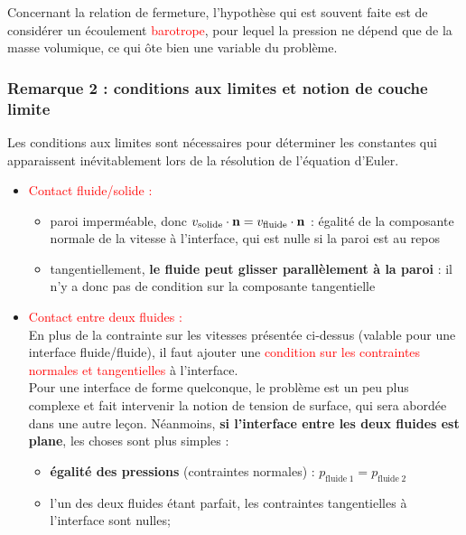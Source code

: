 \documentclass[11pt,a4paper]{report}
\begin{document}
Concernant la relation de fermeture, l'hypothèse qui est souvent faite est de considérer un écoulement \textcolor{red}{barotrope}, pour lequel la pression ne dépend que de la masse volumique, ce qui ôte bien une variable du problème.

\subsubsection{Remarque 2 : conditions aux limites et notion de couche limite}

Les conditions aux limites sont nécessaires pour déterminer les constantes qui apparaissent inévitablement lors de la résolution de l'équation d'Euler.\\

\begin{itemize}
	\item \textcolor{red}{Contact fluide/solide :}\\
	\begin{itemize}
		\item paroi imperméable, donc $v_{\text{solide}}\cdot\bold{n} = v_{\text{fluide}}\cdot\bold{n}$ : 
			égalité de la composante normale de la vitesse à l'interface, qui est nulle si la paroi est au repos
		\item tangentiellement, \textbf{le fluide peut glisser parallèlement à la paroi} : il n'y a donc pas de condition sur la composante tangentielle\\
	\end{itemize}

	\item \textcolor{red}{Contact entre deux fluides :}\\
	En plus de la contrainte sur les vitesses présentée ci-dessus (valable pour une interface fluide/fluide), 
	il faut ajouter une \textcolor{red}{condition sur les contraintes normales et tangentielles} à l'interface.\\
	
	Pour une interface de forme quelconque, le problème est un peu plus complexe et fait intervenir la notion de tension de surface, qui sera abordée dans une autre leçon.
	Néanmoins, \textbf{si l'interface entre les deux fluides est plane}, les choses sont plus simples :
	\begin{itemize}
		\item \textbf{égalité des pressions} (contraintes normales) : $p_{\text{fluide}\;1} = p_{\text{fluide}\;2}$
		\item l'un des deux fluides étant parfait, les contraintes tangentielles à l'interface sont nulles;
	\end{itemize}
\end{itemize}
\end{document}
